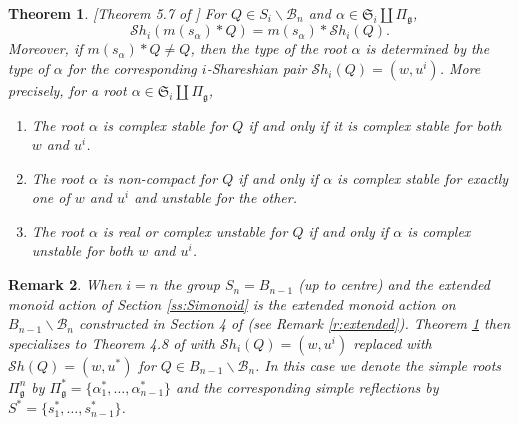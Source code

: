 \documentclass[12pt]{amsart}
\numberwithin{equation}{section}
\newtheorem{thm}{Theorem}[section]
\newtheorem{rem}[thm]{Remark}
\newcommand{\fg}{\mbox{${\mathfrak g}$}}
\newcommand{\B}{\mathcal{B}}
\newcommand{\Sh}{\mathcal{S}h}
\begin{document}
\begin{thm}\label{thm:intertwine}\emph{[Theorem 5.7 of \cite{Siorbits}]}
 For $Q\in S_{i}\backslash\B_{n}$ and $\alpha\in\mathfrak{S}_i\coprod \Pi_{\fg}$,
 \begin{equation}\label{eq:Shinter}
 \Sh_{i}(m(s_{\alpha})*Q)=m(s_{\alpha})*\Sh_{i}(Q).  
 \end{equation}
Moreover, if $m(s_{\alpha})*Q\neq Q$, then the type of the root $\alpha$ is determined by the type of $\alpha$ for the corresponding $i$-Shareshian pair $\Sh_{i}(Q)=(w,u^{i})$.  More precisely, for a root $\alpha\in\mathfrak{S}_i\coprod \Pi_{\fg}$, 
\begin{enumerate}
\item The root $\alpha$ is complex stable for $Q$ if and only if it is complex stable for both $w$ and $u^{i}$.%
\item The root $\alpha$ is non-compact for $Q$ if and only if $\alpha$ is complex stable for exactly one of $w$ and $u^{i}$ and unstable for the other. %
\item The root $\alpha$ is real or complex unstable for $Q$ if and only if $\alpha$ is complex unstable for both $w$ and $u^{i}$.
\end{enumerate}
\end{thm}
\begin{rem}\label{r:Theorem4.7}
When $i=n$ the group $S_{n}=B_{n-1}$ (up to centre) and the extended monoid action of Section \ref{ss:Simonoid} is the extended monoid action on $B_{n-1}\backslash\B_{n}$ constructed in Section 4 of \cite{CE21I} (see Remark \ref{r:extended}).  Theorem \ref{thm:intertwine} then specializes to Theorem 4.8 of \cite{Shpairs} with $\Sh_{i}(Q)=(w, u^{i})$ replaced with $\Sh(Q)=(w, u^{*})$ for $Q\in B_{n-1}\backslash\B_{n}$.  In this case we denote the simple roots $\Pi^{n}_{\fg}$ by $\Pi^{*}_{\fg}=\{\alpha_{1}^{*},\dots, \alpha_{n-1}^{*}\}$ and the corresponding simple reflections by $S^{*}=\{s_{1}^{*},\dots, s_{n-1}^{*}\}$. 
\end{rem}
\end{document}
